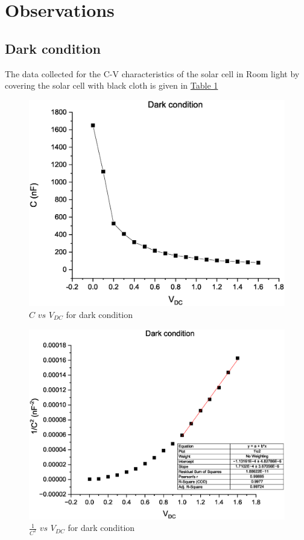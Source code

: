 \section{Observations}
	
	\subsection{Dark condition}
 The data collected for the C-V characteristics of the solar cell in Room light by covering the solar cell with black cloth is given in \hyperref[tab:1]{Table 1}
		
  \begin{figure}[H]
			\centering
			\includegraphics[width=0.75\columnwidth]{images/GR1.eps}
			\caption{ $C$ $vs$ $V_{DC}$ for dark condition}
			\label{graph:1}
\end{figure}
\begin{figure}[H]
			\centering
			\includegraphics[width=0.75\columnwidth]{images/GR5.eps}
			\caption{$\frac{1}{C^2}$ $vs$ $V_{DC}$ for dark condition}
			\label{graph:2}
\end{figure}

